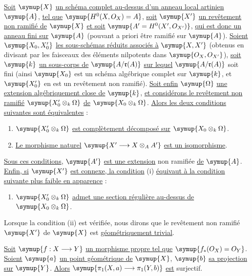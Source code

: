  \uline{Soit} $\symup{X}$ \uline{un schéma complet au-dessus d'un anneau local
artinien} $\symup{A}$, \uline{tel que} $\symup{H^0(X,O_X)=A}$, \uline{soit} $\symup{X'}$ \uline{un revêtement non ramifié de}
$\symup{X}$ \uline{et soit} $\symup{A'=H^0(X',O_{X'})}$, \uline{qui est donc un anneau fini sur} $\symup{A}$
(pouvant a priori être ramifié sur $\symup{A}$). \uline{Soient} $\symup{X_0,X'_0}$ \uline{les
sous-schémas réduits associés à} $\symup{X,X'}$ (obtenus en divisant par les faisceaux
des éléments nilpotents dans $\symup{O_X,O_{X'}}$), \uline{soit} $\symup{k}$ \uline{un sous-corps de}
$\symup{A/\mathfrak r(A)}$ \uline{sur lequel} $\symup{A/\mathfrak r(A)}$ soit fini (ainsi $\symup{X_0}$ est un
schéma algébrique complet sur $\symup{k}$, et $\symup{X'_0}$ en est un revêtement non ramifié).
\uline{Soit enfin} $\symup{\Omega}$ \uline{une extension algébriquement close de} $\symup{k}$, \uline{et considérons
le revêtement non ramifié} $\symup{X'_0\otimes_k\Omega}$ \uline{de}
$\symup{X_0\otimes_k\Omega}$. \uline{Alors les deux conditions suivantes sont équivalentes} :
\begin{enumerate}
  \item[i.] $\symup{X'_0\otimes_k\Omega}$ \uline{est complètement décomposé sur}
    $\symup{X_0\otimes_k\Omega}$.
  \item[ii.] \uline{Le morphisme naturel}
    $\symup{X'\longrightarrow X\otimes_A A'}$ \uline{est un isomorphisme}.
\end{enumerate}
\uline{Sous ces conditions}, $\symup{A'}$ \uline{est une extension} non ramifiée \uline{de} $\symup{A}$. \uline{Enfin, si}
$\symup{X'}$ \uline{est connexe, la condition} (i) \uline{équivaut à la condition suivante
plus faible en apparence} :
\begin{enumerate}
  \item[i. bis] $\symup{X'_0\otimes_k\Omega}$ \uline{admet une section régulière
    au-dessus de} $\symup{X_0\otimes_k\Omega}$.
\end{enumerate}
Lorsque la condition (ii) est vérifiée, nous dirons que le revêtement
non ramifié $\symup{X'}$ de $\symup{X}$ est \uline{géométriquement trivial}.

 \uline{Soit} $\symup{f:X\longrightarrow Y}$ \uline{un morphisme propre tel que}
$\symup{f_*(O_X)=O_Y}$. \uline{Soient} $\symup{a}$ \uline{un point géométrique de} $\symup{X}$, $\symup{b}$ \uline{sa
projection sur} $\symup{Y}$. \uline{Alors}
$\symup{\pi_1(X,a)\longrightarrow\pi_1(Y,b)}$ \uline{est} surjectif.

